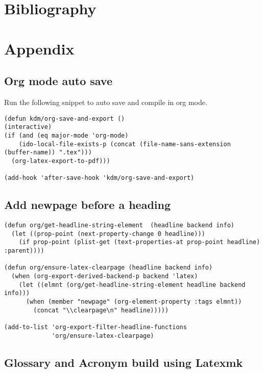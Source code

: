 \documentclass[letterpaper, 12pt]{report}
\begin{document}
\part{Bibliography}
\label{sec:org2722050}




\printglossaries

\part{Appendix}
\label{sec:org594b8e8}
\chapter{Org mode auto save}
\label{sec:org2a75011}
Run the following snippet to auto save and compile in org mode.

\begin{verbatim}
(defun kdm/org-save-and-export ()
(interactive)
(if (and (eq major-mode 'org-mode)
    (ido-local-file-exists-p (concat (file-name-sans-extension (buffer-name)) ".tex")))
  (org-latex-export-to-pdf)))

(add-hook 'after-save-hook 'kdm/org-save-and-export)
\end{verbatim}
\chapter{Add newpage before a heading}
\label{sec:orgc3c29fd}

\begin{verbatim}
(defun org/get-headline-string-element  (headline backend info)
  (let ((prop-point (next-property-change 0 headline)))
    (if prop-point (plist-get (text-properties-at prop-point headline) :parent))))

(defun org/ensure-latex-clearpage (headline backend info)
  (when (org-export-derived-backend-p backend 'latex)
    (let ((elmnt (org/get-headline-string-element headline backend info)))
      (when (member "newpage" (org-element-property :tags elmnt))
        (concat "\\clearpage\n" headline)))))

(add-to-list 'org-export-filter-headline-functions
             'org/ensure-latex-clearpage)

\end{verbatim}
\chapter{Glossary and Acronym build using Latexmk}
\label{sec:org13c88af}
\end{document}
